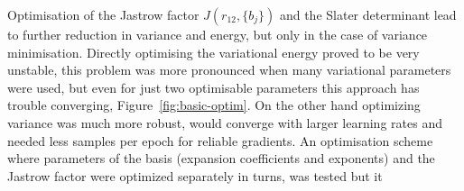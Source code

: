 \documentclass[final,3p,times,twocolumn]{elsarticle}
\begin{document}
	Optimisation of the Jastrow factor $J(r_{12}, \{b_j\})$ and the Slater determinant lead to further reduction in variance and energy, but only in the case of variance minimisation. Directly optimising the variational energy proved to be very unstable, this problem was more pronounced when many variational parameters were used, but even for just two optimisable parameters this approach has trouble converging, Figure~\ref{fig:basic-optim}. On the other hand optimizing variance was much more robust, would converge with larger learning rates and needed less samples per epoch for reliable gradients. An optimisation scheme where parameters of the basis (expansion coefficients and exponents) and the Jastrow factor were optimized separately in turns, was tested but it
	\begin{figure}
		 \\

\end{figure}
\end{document}
